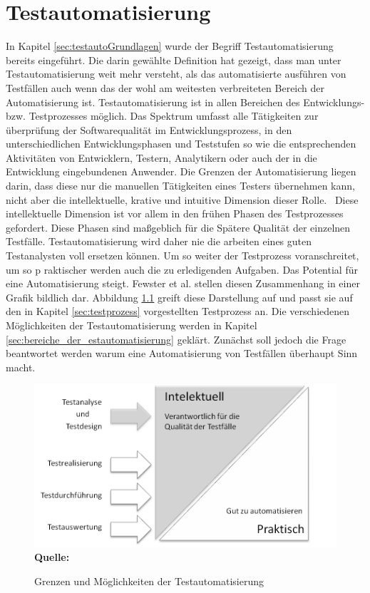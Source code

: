 \chapter{Testautomatisierung}
\label{sec:testautomatisierung}
In Kapitel \ref{sec:testautoGrundlagen} wurde der Begriff Testautomatisierung bereits eingeführt. Die darin gewählte Definition hat gezeigt, dass man unter Testautomatisierung weit mehr versteht, als das automatisierte ausführen von Testfällen auch wenn das der wohl am weitesten verbreiteten Bereich der Automatisierung ist.
Testautomatisierung ist in allen Bereichen des Entwicklungs- bzw. Testprozesses möglich.
\glqq Das Spektrum umfasst alle Tätigkeiten zur überprüfung der Softwarequalität im Entwicklungsprozess, in den unterschiedlichen Entwicklungsphasen und Teststufen so wie die entsprechenden Aktivitäten von Entwicklern, Testern, Analytikern oder auch der in die Entwicklung eingebundenen Anwender. Die Grenzen der Automatisierung liegen darin, dass diese nur die manuellen Tätigkeiten eines Testers übernehmen kann, nicht aber die intellektuelle, krative und intuitive Dimension dieser Rolle.\grqq\ \cite[S.7]{seidl_basiswissen_2012}
Diese intellektuelle Dimension ist vor allem in den frühen Phasen des Testprozesses gefordert. Diese Phasen sind maßgeblich für die Spätere Qualität der einzelnen Testfälle. Testautomatisierung wird daher nie die arbeiten eines guten Testanalysten voll ersetzen können. Um so weiter der Testprozess voranschreitet, um so p
raktischer werden auch die zu erledigenden Aufgaben. Das Potential für eine Automatisierung steigt.
Fewster et al. stellen diesen Zusammenhang in einer Grafik bildlich dar. \cite[vgl. S.18]{fewster_software_1999} Abbildung \ref{fig:intellektuellVsPraktisch} greift diese Darstellung auf und passt sie auf den in Kapitel \ref{sec:testprozess} vorgestellten Testprozess an. Die verschiedenen Möglichkeiten der Testautomatisierung werden in Kapitel \ref{sec:bereiche_der_estautomatisierung} geklärt. Zunächst soll jedoch die Frage beantwortet werden warum eine Automatisierung von Testfällen überhaupt Sinn macht.

\begin{figure}[htb]
  \centering  
  \includegraphics[scale=1]{img/intelektuellVsPraktisch.png}\\
  \footnotesize\sffamily\textbf{Quelle:} \cite[vgl. S.18]{fewster_software_1999}
  \caption{Grenzen und Möglichkeiten der Testautomatisierung}
  \label{fig:intellektuellVsPraktisch}
\end{figure}

